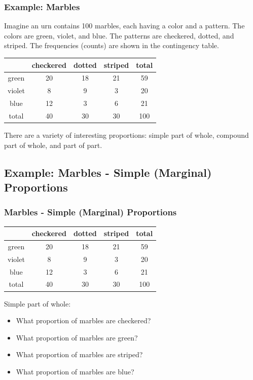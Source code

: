 \begin{frame}
\frametitle{Example: Marbles}

Imagine an urn contains 100 marbles, each having a color and a pattern. The colors are green, violet, and blue. The patterns are checkered, dotted, and striped. The frequencies (counts) are shown in the contingency table.

\begin{center}
\begin{tabular}{c|c c c | c}
       & checkered & dotted & striped & total \\ \hline
green  &  20       &  18    & 21 & 59 \\
violet & 8         &  9     & 3  & 20 \\
blue   & 12        & 3      & 6  & 21 \\ \hline
total  & 40        & 30     & 30 & 100 
\end{tabular}
\end{center}

There are a variety of interesting proportions: simple part of whole, compound part of whole, and part of part.

\end{frame}


\subsection{Example: Marbles - Simple (Marginal) Proportions}



\begin{frame}
\frametitle{Marbles - Simple (Marginal) Proportions}

\begin{center}
\begin{tabular}{c|c c c | c}
       & checkered & dotted & striped & total \\ \hline
green  &  20       &  18    & 21 & 59 \\
violet & 8         &  9     & 3  & 20 \\
blue   & 12        & 3      & 6  & 21 \\ \hline
total  & 40        & 30     & 30 & 100 
\end{tabular}
\end{center}

Simple part of whole:
\begin{itemize}
\item What proportion of marbles are checkered? 
\item What proportion of marbles are green? 
\item What proportion of marbles are striped? 
\item What proportion of marbles are blue? 
\end{itemize}

\end{frame}


